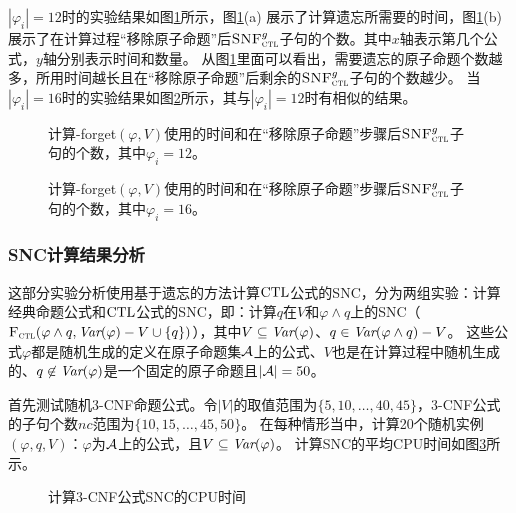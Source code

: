 $|\varphi_i|=12$时的实验结果如图\ref{chapter04:fig:for12}所示，图\ref{chapter04:fig:for12}(a) 展示了计算遗忘所需要的时间，图\ref{chapter04:fig:for12}(b)展示了在计算过程“移除原子命题”后${\textsc{SNF}_{\textsc{ctl}}^g}$子句的个数。其中$x$轴表示第几个公式，$y$轴分别表示时间和数量。
从图\ref{chapter04:fig:for12}里面可以看出，需要遗忘的原子命题个数越多，所用时间越长且在“移除原子命题”后剩余的${\textsc{SNF}_{\textsc{ctl}}^g}$子句的个数越少。
当$|\varphi_i|=16$时的实验结果如图\ref{chapter04:fig:for16}所示，其与$|\varphi_i|=12$时有相似的结果。

\begin{figure*}[!htb]
	\centering
	\caption{计算{\CTL-forget}$(\varphi, V)$使用的时间和在“移除原子命题”步骤后${\textsc{SNF}_{\textsc{ctl}}^g}$子句的个数，其中$\varphi_i=12$。}
	\label{chapter04:fig:for12}
\end{figure*}

\begin{figure*}[!htb]
	\centering
	\caption{计算{\CTL-forget}$(\varphi, V)$使用的时间和在“移除原子命题”步骤后${\textsc{SNF}_{\textsc{ctl}}^g}$子句的个数，其中$\varphi_i=16$。}
	\label{chapter04:fig:for16}
\end{figure*}

\subsubsection{SNC计算结果分析}
这部分实验分析使用基于遗忘的方法计算$\textrm{CTL}$公式的SNC，分为两组实验：计算经典命题公式和$\textrm{CTL}$公式的SNC，即：计算$q$在$V$和$\varphi \wedge q$上的SNC（${\textsc{F}_{\textsc{ctl}}}(\varphi\wedge q, \textit{Var}(\varphi)-V \cup \{q\})$），其中$V\subseteq \textit{Var}(\varphi)$、$q\in \textit{Var}(\varphi\wedge q)-V$。
这些公式$\varphi$都是随机生成的定义在原子命题集${\cal A}$上的公式、$V$也是在计算过程中随机生成的、$q\not \in \textit{Var}(\varphi)$是一个固定的原子命题且$|{\cal A}|=50$。

首先测试随机3-CNF命题公式。令$|V|$的取值范围为$\{5,10,\dots, 40,45\}$，3-CNF公式的子句个数$nc$范围为$\{10,15,\dots, 45,50\}$。
在每种情形当中，计算20个随机实例$(\varphi,q,V)$：$\varphi$为${\cal A}$上的公式，且$V\subseteq \textit{Var}(\varphi)$。
计算SNC的平均CPU时间如图\ref{chapter04:fig:ProTime}所示。

\begin{figure*}[!htb]
	\centering
	\caption{%
		计算3-CNF公式SNC的CPU时间}
	\label{chapter04:fig:ProTime}
\end{figure*}


